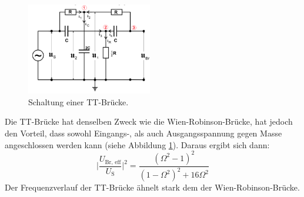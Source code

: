 \begin{figure}[h]
  \centering
  \includegraphics[height=4cm]{Grafiken/TT.pdf}
  \caption{Schaltung einer TT-Brücke. \cite{1}}
  \label{fig:TT}
\end{figure}
Die TT-Brücke hat denselben Zweck wie die Wien-Robinson-Brücke, hat jedoch den Vorteil, dass sowohl Eingangs-, als auch Ausgangsspannung gegen Masse angeschlossen werden kann (siehe Abbildung \ref{fig:TT}). 
Daraus ergibt sich dann:
\begin{equation}
	\biggl | \frac{U_\text{Br, eff}}{U_\text{S}} \biggr |^2 = \frac{(\Omega^2 -1)^2}{(1- \Omega^2)^2 + 16\Omega^2}
\end{equation}
Der Frequenzverlauf der TT-Brücke ähnelt stark dem der Wien-Robinson-Brücke.
